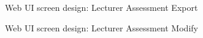 \begin{figure}[H]
\centering	
{}
\caption{Web UI screen design: Lecturer Assessment Export}
\end{figure}

\begin{figure}[H]
\centering	
{}
\caption{Web UI screen design: Lecturer Assessment Modify}
\end{figure}